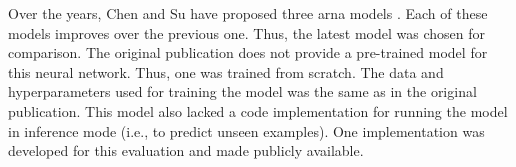 
Over the years, Chen and Su have proposed three \gls{arna}
models \parencite{chen2018functional, chen2019harmony,
chen2021attend}. Each of these models improves over the
previous one. Thus, the latest model
\parencite{chensu2021attend} was chosen for comparison. The
original publication does not provide a pre-trained model
for this neural network. Thus, one was trained from scratch.
The data and hyperparameters used for training the model was
the same as in the original publication. This model also
lacked a code implementation for running the model in
inference mode (i.e., to predict unseen examples). One
implementation was developed for this evaluation and made
publicly
available.

